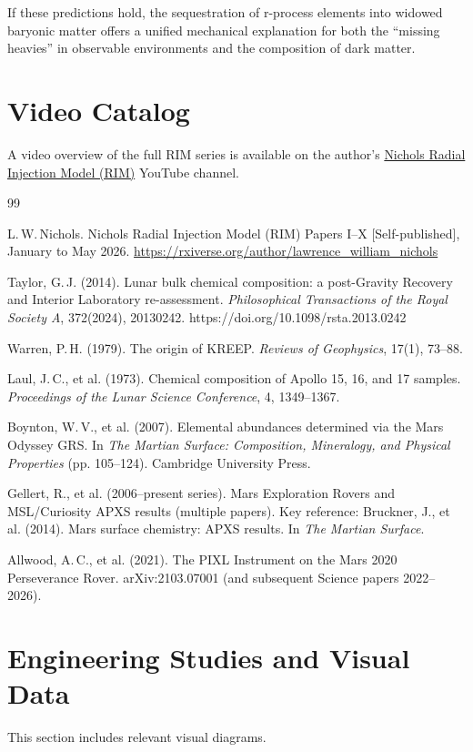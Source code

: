 \documentclass[12pt]{article}
\begin{document}
If these predictions hold, the sequestration of r-process elements into widowed baryonic matter offers a unified mechanical explanation for both the ``missing heavies'' in observable environments and the composition of dark matter.

\section{Video Catalog}
A video overview of the full RIM series is available on the author's \href{https://www.youtube.com/@Nichols_Thought_Experiments}{Nichols Radial Injection Model (RIM)} YouTube channel.

\begin{thebibliography}{99}

L.\,W.\,Nichols.
Nichols Radial Injection Model (RIM) Papers I--X [Self-published], January to May 2026.
\newline
\url{https://rxiverse.org/author/lawrence_william_nichols}

Taylor, G.\,J. (2014).
Lunar bulk chemical composition: a post-Gravity Recovery and Interior Laboratory re-assessment.
\textit{Philosophical Transactions of the Royal Society A}, 372(2024), 20130242.
https://doi.org/10.1098/rsta.2013.0242

Warren, P.\,H. (1979).
The origin of KREEP.
\textit{Reviews of Geophysics}, 17(1), 73--88.

Laul, J.\,C., et al. (1973).
Chemical composition of Apollo 15, 16, and 17 samples.
\textit{Proceedings of the Lunar Science Conference}, 4, 1349--1367.

Boynton, W.\,V., et al. (2007).
Elemental abundances determined via the Mars Odyssey GRS.
In \textit{The Martian Surface: Composition, Mineralogy, and Physical Properties} (pp. 105--124). Cambridge University Press.

Gellert, R., et al. (2006--present series).
Mars Exploration Rovers and MSL/Curiosity APXS results (multiple papers).
Key reference: Bruckner, J., et al. (2014).
Mars surface chemistry: APXS results.
In \textit{The Martian Surface}.

Allwood, A.\,C., et al. (2021).
The PIXL Instrument on the Mars 2020 Perseverance Rover.
arXiv:2103.07001 (and subsequent Science papers 2022--2026).

\end{thebibliography}

\newpage

\section{Engineering Studies and Visual Data}
This section includes relevant visual diagrams.

\end{document}
